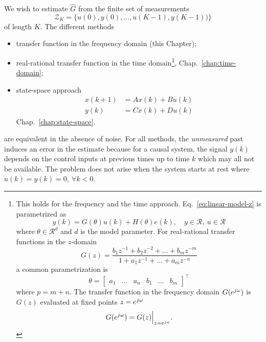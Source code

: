 We wish to estimate $\hat{G}$ from the finite set of measurements
\begin{equation*}
  \mathcal{Z}_K = \{u(0),y(0),\ldots,u(K-1),y(K-1))\}
\end{equation*}
of length $K$. The different methods
\begin{itemize}
\item transfer function in the frequency domain (this Chapter);
\item real-rational transfer function in the time domain\footnote{
    This holds for the frequency and the time approach. Eq.~\eqref{eq:linear-model-z} is parametrized as
    \begin{equation*}
      y(k) = G(\theta)u(k) + H(\theta)e(k),\hspace{1em}y \in \mathcal{R},\ u\in \mathcal{R}
    \end{equation*}
    where $\theta \in \mathcal{R}^d$ and $d$ is the model parameter. For real-rational transfer functions in the $z$-domain
    \begin{equation}
      G(z) = \frac{b_1z^{-1} + b_2z^{-2} + \ldots + b_mz^{-m}}{1 + a_1z^{-1} + \ldots + a_mz^{-n}}
    \end{equation}
    a common parametrization is
    \begin{equation*}
      \theta =
      \begin{bmatrix}
        a_1 & \ldots & a_n & b_1 & \ldots & b_m
      \end{bmatrix}^\top
    \end{equation*}
    where $p = m+n$. The transfer function in the frequency domain $G(e^{j\omega})$ is $G(z)$ evaluated at fixed points $z=e^{j\omega}$
    \begin{equation*}
      G(e^{j\omega}) = G(z)\Big|_{z=e^{j\omega}}.
    \end{equation*}}, Chap.~\ref{chap:time-domain};
\item state-space approach
  \begin{equation*}
    \begin{aligned}
      x(k+1) &= Ax(k) + Bu(k) \\
      y(k) &= Cx(k) + Du(k)
    \end{aligned}
  \end{equation*}
  Chap.~\ref{chap:state-space}.
\end{itemize}
are equivalent in the absence of noise. For all methods, the \emph{unmeasured} past induces an error in the estimate because for a causal system, the signal $y(k)$ depends on the control inputs at previous times up to time $k$ which may all not be available. The problem does not arise when the system starts at rest where $u(k)=y(k)=0,\ \forall k<0$.

